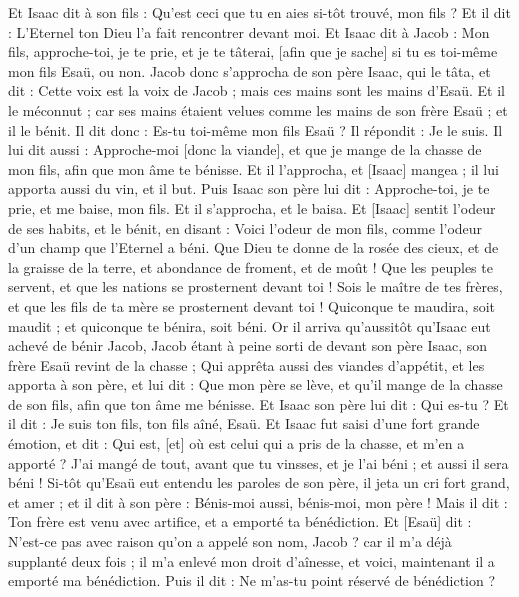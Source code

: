 \begin{multicols}{2}
Et Isaac dit à son fils : Qu'est ceci que tu en aies si-tôt trouvé, mon fils ? Et il dit : L'Eternel ton Dieu l'a fait rencontrer devant moi.
Et Isaac dit à Jacob : Mon fils, approche-toi, je te prie, et je te tâterai, [afin que je sache] si tu es toi-même mon fils Esaü, ou non.
Jacob donc s'approcha de son père Isaac, qui le tâta, et dit : Cette voix est la voix de Jacob ; mais ces mains sont les mains d'Esaü.
Et il le méconnut ; car ses mains étaient velues comme les mains de son frère Esaü ; et il le bénit.
Il dit donc : Es-tu toi-même mon fils Esaü ? Il répondit : Je le suis.
Il lui dit aussi : Approche-moi [donc la viande], et que je mange de la chasse de mon fils, afin que mon âme te bénisse. Et il l'approcha, et [Isaac] mangea ; il lui apporta aussi du vin, et il but.
Puis Isaac son père lui dit : Approche-toi, je te prie, et me baise, mon fils.
Et il s'approcha, et le baisa. Et [Isaac] sentit l'odeur de ses habits, et le bénit, en disant : Voici l'odeur de mon fils, comme l'odeur d'un champ que l'Eternel a béni.
Que Dieu te donne de la rosée des cieux, et de la graisse de la terre, et abondance de froment, et de moût !
Que les peuples te servent, et que les nations se prosternent devant toi ! Sois le maître de tes frères, et que les fils de ta mère se prosternent devant toi ! Quiconque te maudira, soit maudit ; et quiconque te bénira, soit béni.
Or il arriva qu'aussitôt qu'Isaac eut achevé de bénir Jacob, Jacob étant à peine sorti de devant son père Isaac, son frère Esaü revint de la chasse ;
Qui apprêta aussi des viandes d'appétit, et les apporta à son père, et lui dit : Que mon père se lève, et qu'il mange de la chasse de son fils, afin que ton âme me bénisse.
Et Isaac son père lui dit : Qui es-tu ? Et il dit : Je suis ton fils, ton fils aîné, Esaü.
Et Isaac fut saisi d'une fort grande émotion, et dit : Qui est, [et] où est celui qui a pris de la chasse, et m'en a apporté ? J'ai mangé de tout, avant que tu vinsses, et je l'ai béni ; et aussi il sera béni !
Si-tôt qu'Esaü eut entendu les paroles de son père, il jeta un cri fort grand, et amer ; et il dit à son père : Bénis-moi aussi, bénis-moi, mon père !
Mais il dit : Ton frère est venu avec artifice, et a emporté ta bénédiction.
Et [Esaü] dit : N'est-ce pas avec raison qu'on a appelé son nom, Jacob ? car il m'a déjà supplanté deux fois ; il m'a enlevé mon droit d'aînesse, et voici, maintenant il a emporté ma bénédiction. Puis il dit : Ne m'as-tu point réservé de bénédiction ?

\end{multicols}

